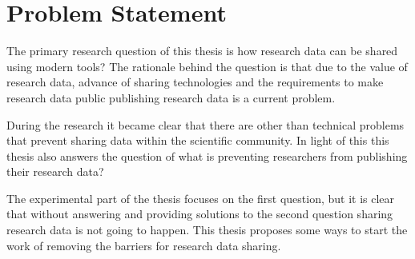 \chapter{Problem Statement}
\label{chapter:problem}

The primary research question of this thesis is how research data can be shared
using modern tools? The rationale behind the question is that due to the
value of research data, advance of sharing technologies and the requirements
to make research data public publishing research data is a current problem.

During the research it became clear that there are other than technical
problems that prevent sharing data within the scientific community. In light
of this this thesis also answers the question of what is preventing researchers
from publishing their research data?

The experimental part of the thesis focuses on the first question, but it is
clear that without answering and providing solutions to the second question
sharing research data is not going to happen. This thesis proposes some ways
to start the work of removing the barriers for research data sharing.

\iffalse
This is a chapter where we rigorously define the problem statement.

Here is the problem background:

\begin{itemize}
    \item there is a growing demand on making research data public for other
          scientist and the public
    \item demand from funding agencies and open access community
    \item also scientific principles - how are you going to replicate others'
          work without the same datasets?
    \item furthering science
    \item these points need to be made concise and be backed up with literature
\end{itemize}

And here is what practical problems it will pose:

\begin{itemize}
    \item no infrastructure
    \item no know-how
    \item no culture
    \item there is demand, but there are no repercussions for not sharing the
          data
    \item many datasets are not suitable for publishing as is
\end{itemize}

\fi

